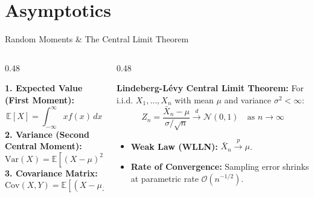 \documentclass[aspectratio=169, 9pt]{beamer}
\begin{document}
\section{Asymptotics}
\begin{frame}{Random Moments \& The Central Limit Theorem}
    \begin{columns}[t]
        \begin{column}{0.48\textwidth}
            \par\vspace{0.2em}
            \scriptsize
            \textbf{1. Expected Value (First Moment):}
            \begin{equation*}
                \mathbb{E}[X] = \int_{-\infty}^{\infty} x f(x) \, dx
            \end{equation*}
            \textbf{2. Variance (Second Central Moment):}
            \begin{equation*}
                \mathrm{Var}(X) = \mathbb{E}[(X - \mu)^2] = \mathbb{E}[X^2] - (\mathbb{E}[X])^2
            \end{equation*}
            \textbf{3. Covariance Matrix:}
            \begin{equation*}
                \mathrm{Cov}(X, Y) = \mathbb{E}[(X - \mu_X)(Y - \mu_Y)]
            \end{equation*}
        \end{column}
        \begin{column}{0.48\textwidth}
            \par\vspace{0.2em}
            \scriptsize
            \textbf{Lindeberg-L\'{e}vy Central Limit Theorem:}
            For i.i.d. $X_1, \dots, X_n$ with mean $\mu$ and variance $\sigma^2 < \infty$:
            \begin{equation*}
                Z_n = \frac{\bar{X}_n - \mu}{\sigma / \sqrt{n}} \xrightarrow{d} \mathcal{N}(0, 1) \quad \text{as } n \to \infty
            \end{equation*}
            \vspace{0.1em}
            \begin{itemize}\setlength{\itemsep}{2pt}
                \item \textbf{Weak Law (WLLN):} $\bar{X}_n \xrightarrow{p} \mu$.
                \item \textbf{Rate of Convergence:} Sampling error shrinks at parametric rate $\mathcal{O}(n^{-1/2})$.
            \end{itemize}
        \end{column}
    \end{columns}
\end{frame}
\end{document}
